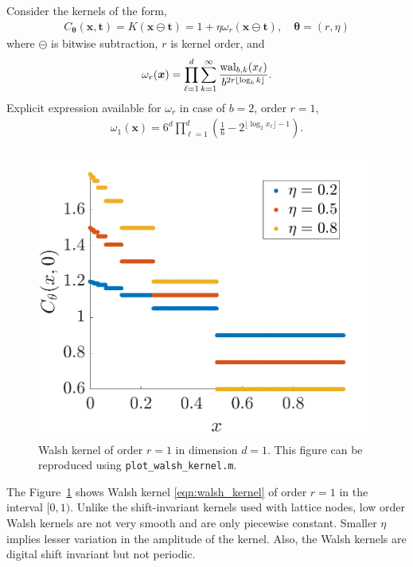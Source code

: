 \documentclass{iitthesis}          %
\newcommand{\bm}[1]{\boldsymbol{#1}}
\newcommand{\vtheta}{{\bm{\theta}}}
\newcommand{\vt}{\bm{t}}
\newcommand{\vx}{\bm{x}}
\newcommand{\code}[1]{\texttt{#1}}
\newcommand\figref{Figure~\ref}
\newcommand{\JRNote}[1]{{\textcolor{green}{JR: #1}}}
\begin{document}
Consider the kernels of the form,
\begin{align}
\label{eqn:walsh_kernel}
C_{\vtheta}(\vx, \vt) = K (\vx \ominus \vt) =  1 + \eta \omega_{r} (\vx \ominus \vt), \quad \vtheta = (r, \eta)
\end{align}
where $\ominus$ is bitwise subtraction, $r$ is kernel order, and
\begin{align*}
\omega_r(\vx) = \prod_{\ell=1}^d \sum_{k=1}^\infty 
\frac{\textup{wal}_{b,k}(x_\ell) }{b^{2r \lfloor \log_b k \rfloor}}.
\end{align*}
Explicit expression available for $\omega_{r}$ \cite{Nuyens2013} in case of $b=2$, order $r=1$, %
\begin{align}
\label{eqn:omega1}
\omega_1(\vx) 
 = 6^d \prod_{\ell=1}^d \left( \frac 16 - 2^{\lfloor \log_2 x_\ell \rfloor -1 }\right).
\end{align}

\begin{figure}
	\centering
	\includegraphics[width=0.9\linewidth]{"figures/walsh_kernel dim_1"}
	\caption[Walsh kernel]{Walsh kernel of order $r=1$ in dimension $d=1$. This figure can be reproduced using \code{plot\_walsh\_kernel.m}. %
	}
	\label{fig:walshkernel-dim1}
\end{figure}
The \figref{fig:walshkernel-dim1} shows Walsh kernel \eqref{eqn:walsh_kernel} of order $r=1$ in the interval $[0,1)$. Unlike the shift-invariant kernels used with lattice nodes, low order Walsh kernels are not very smooth and are only piecewise constant. Smaller $\eta$ implies lesser variation in the amplitude of the kernel. Also, the Walsh kernels are digital shift invariant but not periodic.
\end{document}
